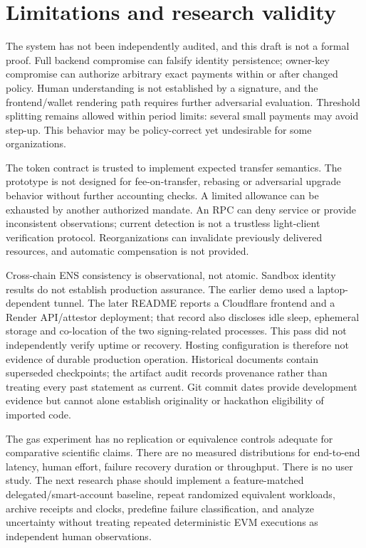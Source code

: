 \documentclass[11pt]{article}
\begin{document}
\section{Limitations and research validity}
The system has not been independently audited, and this draft is not a formal proof. Full backend compromise can falsify identity persistence; owner-key compromise can authorize arbitrary exact payments within or after changed policy. Human understanding is not established by a signature, and the frontend/wallet rendering path requires further adversarial evaluation. Threshold splitting remains allowed within period limits: several small payments may avoid step-up. This behavior may be policy-correct yet undesirable for some organizations.

The token contract is trusted to implement expected transfer semantics. The prototype is not designed for fee-on-transfer, rebasing or adversarial upgrade behavior without further accounting checks. A limited allowance can be exhausted by another authorized mandate. An RPC can deny service or provide inconsistent observations; current detection is not a trustless light-client verification protocol. Reorganizations can invalidate previously delivered resources, and automatic compensation is not provided.

Cross-chain ENS consistency is observational, not atomic. Sandbox identity results do not establish production assurance. The earlier demo used a laptop-dependent tunnel. The later README reports a Cloudflare frontend and a Render API/attestor deployment; that record also discloses idle sleep, ephemeral storage and co-location of the two signing-related processes. This pass did not independently verify uptime or recovery. Hosting configuration is therefore not evidence of durable production operation. Historical documents contain superseded checkpoints; the artifact audit records provenance rather than treating every past statement as current. Git commit dates provide development evidence but cannot alone establish originality or hackathon eligibility of imported code.

The gas experiment has no replication or equivalence controls adequate for comparative scientific claims. There are no measured distributions for end-to-end latency, human effort, failure recovery duration or throughput. There is no user study. The next research phase should implement a feature-matched delegated/smart-account baseline, repeat randomized equivalent workloads, archive receipts and clocks, predefine failure classification, and analyze uncertainty without treating repeated deterministic EVM executions as independent human observations.
\end{document}
